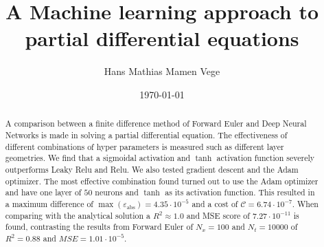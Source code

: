 \documentclass[11pt]{article}
\title{A Machine learning approach to partial differential equations}
\author{Hans Mathias Mamen Vege}
\date{\today}
\begin{document}
\maketitle

\begin{abstract}
A comparison between a finite difference method of Forward Euler and Deep Neural Networks is made in solving a partial differential equation. The effectiveness of different combinations of hyper parameters is measured such as different layer geometries. We find that a sigmoidal activation and $\tanh$ activation function severely outperforms Leaky Relu and Relu. We also tested gradient descent and the Adam optimizer. The most effective combination found turned out to use the Adam optimizer and have one layer of $50$ neurons and $\tanh$ as its activation function. This resulted in a maximum difference of $\max(\varepsilon_\mathrm{abs})=4.35\cdot 10^{-5}$ and a cost of $\mathcal{C} = 6.74 \cdot 10^{-7}$. When comparing with the analytical solution a $R^2 \approx 1.0$ and MSE score of $7.27\cdot 10^{-11}$ is found, contrasting the results from Forward Euler of $N_x=100$ and $N_t=10000$ of $R^2=0.88$ and $MSE=1.01\cdot 10^{-5}$.
\end{abstract}


















\end{document}
